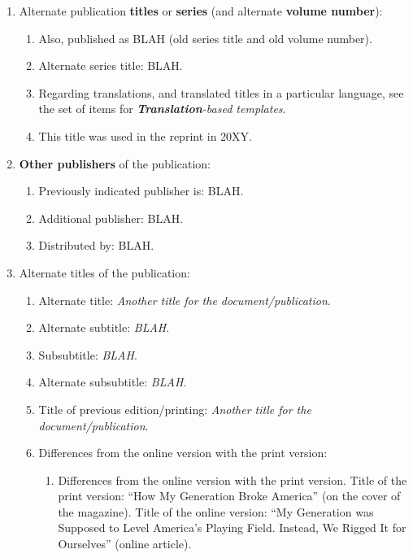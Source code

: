 \documentclass[letter,12pt]{article}
\begin{document}
\begin{enumerate}
\begin{enumerate}
\begin{enumerate}
\begin{enumerate}
			\end{enumerate}
		\end{enumerate}
	\item Alternate publication {\bf titles} or {\bf series} (and alternate {\bf volume number}): \vspace{-0.2cm}
		\begin{enumerate} \itemsep -2pt
		\item Also, published as BLAH (old series title and old volume number).
		\item Alternate series title: BLAH.
		\item Regarding translations, and translated titles in a particular language, see the set of items for {\it {\bf Translation}-based templates}.
		\item This title was used in the reprint in 20XY.
		\end{enumerate}
	\item {\bf Other publishers} of the publication: \vspace{-0.2cm}
		\begin{enumerate} \itemsep -2pt
		\item Previously indicated publisher is: BLAH.
		\item Additional publisher: BLAH.
		\item Distributed by: BLAH.
		\end{enumerate}
	\item Alternate titles of the publication: \vspace{-0.2cm}
		\begin{enumerate} \itemsep -2pt
		\item Alternate title: {\it Another title for the document/publication}.
		\item Alternate subtitle: {\it BLAH}.
		\item Subsubtitle: {\it BLAH}.
		\item Alternate subsubtitle: {\it BLAH}.
		\item Title of previous edition/printing: {\it Another title for the document/publication}.
		\item Differences from the online version with the print version: \vspace{-0.1cm}
			\begin{enumerate} \itemsep -1pt
			\item Differences from the online version with the print version. Title of the print version: ``How My Generation Broke America'' (on the cover of the magazine). Title of the online version: ``My Generation was Supposed to Level America's Playing Field. Instead, We Rigged It for Ourselves'' (online article).

\end{enumerate}
\end{enumerate}
\end{enumerate}
\end{enumerate}
\end{document}
